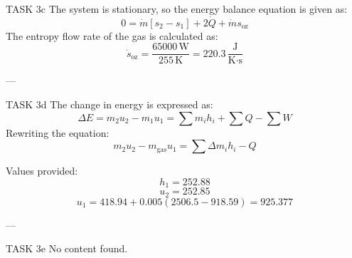 TASK 3c  
The system is stationary, so the energy balance equation is given as:  
\[
0 = \dot{m} \left[ s_2 - s_1 \right] + 2 \dot{Q} + \dot{m} s_{\text{oz}}
\]  
The entropy flow rate of the gas is calculated as:  
\[
\dot{s}_{\text{oz}} = \frac{65000 \, \text{W}}{255 \, \text{K}} = 220.3 \, \frac{\text{J}}{\text{K·s}}
\]  

---

TASK 3d  
The change in energy is expressed as:  
\[
\Delta E = m_2 u_2 - m_1 u_1 = \sum m_i h_i + \sum Q - \sum W
\]  
Rewriting the equation:  
\[
m_2 u_2 - m_{\text{gas}} u_1 = \sum \Delta m_i h_i - Q
\]  

Values provided:  
\[
h_1 = 252.88
\]  
\[
u_2 = 252.85
\]  
\[
u_1 = 418.94 + 0.005 \left( 2506.5 - 918.59 \right) = 925.377
\]  

---

TASK 3e  
No content found.